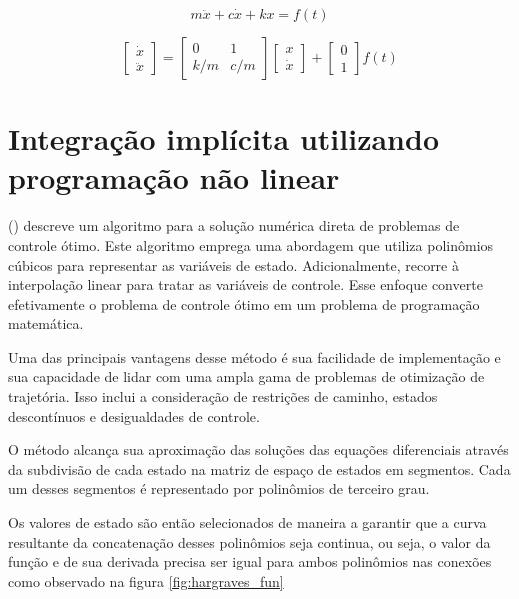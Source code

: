 \begin{equation}
    \label{eq:edo_ex}
    m \ddot x+c \dot x+kx = f(t)
\end{equation}

\begin{equation}
    \label{eq:espaco_de_estados_ex}
    \begin{bmatrix}
        \dot x \\
        \ddot x
    \end{bmatrix}
    =
    \begin{bmatrix}
        0 & 1 \\
        k/m & c/m
    \end{bmatrix}
    \begin{bmatrix}
        x \\
        \dot x
    \end{bmatrix}
    +
    \begin{bmatrix}
        0 \\
        1
    \end{bmatrix}
    f(t)
\end{equation}

\section{Integração implícita utilizando programação não linear}

\citeauthor{hargraves87} (\citeyear{hargraves87}) descreve um algoritmo para a solução numérica direta de problemas de controle ótimo. Este algoritmo emprega uma abordagem que utiliza polinômios cúbicos para representar as variáveis de estado. Adicionalmente, recorre à interpolação linear para tratar as variáveis de controle. Esse enfoque converte efetivamente o problema de controle ótimo em um problema de programação matemática.

Uma das principais vantagens desse método é sua facilidade de implementação e sua capacidade de lidar com uma ampla gama de problemas de otimização de trajetória. Isso inclui a consideração de restrições de caminho, estados descontínuos e desigualdades de controle.

O método alcança sua aproximação das soluções das equações diferenciais através da subdivisão de cada estado na matriz de espaço de estados em segmentos. Cada um desses segmentos é representado por polinômios de terceiro grau.

Os valores de estado são então selecionados de maneira a garantir que a curva resultante da concatenação desses polinômios seja continua, ou seja, o valor da função e de sua derivada precisa ser igual para ambos polinômios nas conexões como observado na figura \ref{fig:hargraves_fun}


